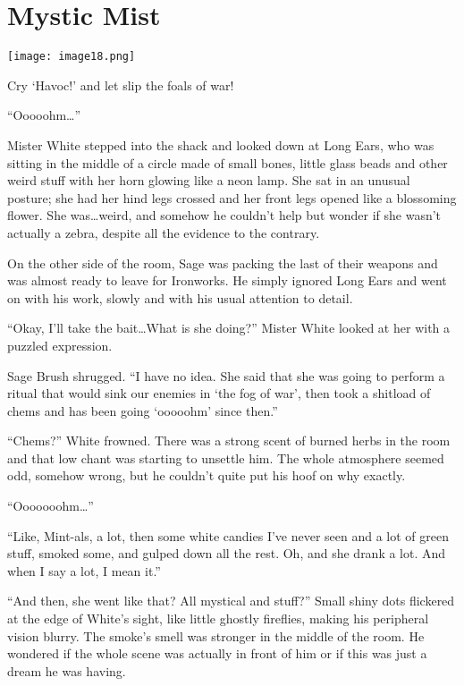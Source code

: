 
\chapter{Mystic Mist}

\texttt{[image: image18.png]}

\begin{intro}
Cry `Havoc!' and let slip the foals of war!
\end{intro}



``Ooooohm\dots''

Mister White stepped into the shack and looked down at Long Ears, who was sitting in the middle of a circle made of small bones, little glass beads and other weird stuff with her horn glowing like a neon lamp. She sat in an unusual posture; she had her hind legs crossed and her front legs opened like a blossoming flower. She was\dots weird, and somehow he couldn't help but wonder if she wasn't actually a zebra, despite all the evidence to the contrary.

On the other side of the room, Sage was packing the last of their weapons and was almost ready to leave for Ironworks. He simply ignored Long Ears and went on with his work, slowly and with his usual attention to detail.

``Okay, I'll take the bait\dots What is she doing?'' Mister White looked at her with a puzzled expression.

Sage Brush shrugged. ``I have no idea. She said that she was going to perform a ritual that would sink our enemies in `the fog of war', then took a shitload of chems and has been going `ooooohm' since then.''

``Chems?'' White frowned. There was a strong scent of burned herbs in the room and that low chant was starting to unsettle him. The whole atmosphere seemed odd, somehow wrong, but he couldn't quite put his hoof on why exactly.

``Ooooooohm\dots''

``Like, Mint-als, a lot, then some white candies I've never seen and a lot of green stuff, smoked some, and gulped down all the rest. Oh, and she drank a lot. And when I say a lot, I mean it.''

``And then, she went like that? All mystical and stuff?'' Small shiny dots flickered at the edge of White's sight, like little ghostly fireflies, making his peripheral vision blurry. The smoke's smell was stronger in the middle of the room. He wondered if the whole scene was actually in front of him or if this was just a dream he was having.

